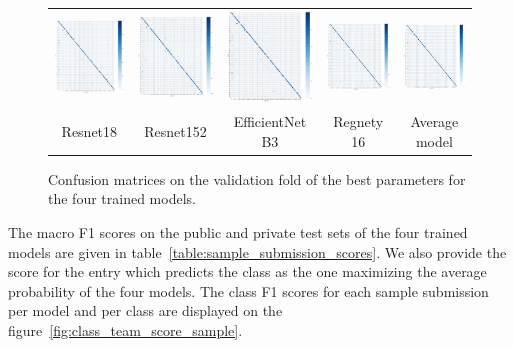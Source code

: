 \documentclass{article}
\begin{document}
\begin{figure}[!htbp]
	\begin{tabular}{ccccc}
		\includegraphics[width=0.18\columnwidth]{figs/confusion_matrix_resnet18.png}&
		\includegraphics[width=0.18\columnwidth]{figs/confusion_matrix_resnet152.png}&
		\includegraphics[width=0.18\columnwidth]{figs/confusion_matrix_efficientnetb3.png}&
		\includegraphics[width=0.18\columnwidth]{figs/confusion_matrix_regnety16.png} &
		\includegraphics[width=0.18\columnwidth]{figs/confusion_matrix_average.png}\\
		Resnet18 & Resnet152 & EfficientNet B3 & Regnety 16 & Average model
	\end{tabular}
	\caption{\label{fig:sample_submission_confusion_matrix} Confusion matrices on the validation fold of the best parameters for the four trained models.}
\end{figure}


The macro F1 scores on the public and private test sets of the four trained models are given in table~\ref{table:sample_submission_scores}. We also provide the score for the entry which predicts the class as the one maximizing the average probability of the four models. The class F1 scores for each sample submission per model and per class are displayed on the figure~\ref{fig:class_team_score_sample}. 
\end{document}
